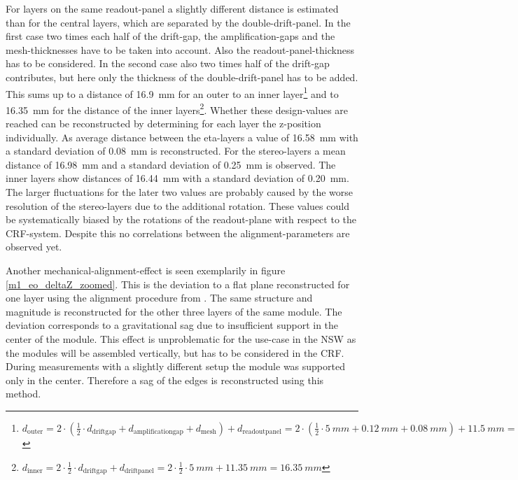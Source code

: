 \documentclass[
twoside,            %
BCOR1.4cm,          %
10pt,               %
headings=normal,    %
headsepline,        %
clearplainpage,		%
final,              %
div=14,
open=right,
bibliography=toc
]{scrreprt}
\begin{document}
For layers on the same readout-panel a slightly different distance is estimated than for the central layers, which are separated by the double-drift-panel.
In the first case two times each half of the drift-gap, the amplification-gaps and the mesh-thicknesses have to be taken into account.
Also the readout-panel-thickness has to be considered.
In the second case also two times half of the drift-gap contributes, but here only the thickness of the double-drift-panel has to be added.
This sums up to a distance of \SI{16.9}{mm} for an outer to an inner layer\footnote{
	$d_{\mathrm{outer}} = 
		2 \cdot 
			\left( 
					\tfrac{1}{2} \cdot d_{\mathrm{driftgap}} 
					+ d_{\mathrm{amplificationgap}} 
					+ d_{\mathrm{mesh}} 
			\right) 
		+ d_{\mathrm{readoutpanel}}
	   = 
		2 \cdot
			\left(
					\tfrac{1}{2} \cdot \SI{5}{mm}
					+ \SI{0.12}{mm}
					+ \SI{0.08}{mm}
			\right)
		+ \SI{11.5}{mm}
	= \SI{16.9}{mm}
	$
} 
 and to 
\SI{16.35}{mm} for the distance of the inner layers\footnote{
	$d_{\mathrm{inner}} = 
		2 \cdot \tfrac{1}{2} \cdot d_{\mathrm{driftgap}}
		+ d_{\mathrm{driftpanel}}
	   = 
		2 \cdot \tfrac{1}{2} \cdot \SI{5}{mm} 
		+ \SI{11.35}{mm}
	= \SI{16.35}{mm}
	$
}.
Whether these design-values are reached can be reconstructed by determining for each layer the z-position individually.
As average distance between the eta-layers a value of \SI{16.58}{mm} with a standard deviation of \SI{0.08}{mm} is reconstructed.
For the stereo-layers a mean distance of \SI{16.98}{mm} and a standard deviation of \SI{0.25}{mm} is observed.
The inner layers show distances of \SI{16.44}{mm} with a standard deviation of \SI{0.20}{mm}.
The larger fluctuations for the later two values are probably caused by the worse resolution of the stereo-layers due to the additional rotation.
These values could be systematically biased by the rotations of the readout-plane with respect to the CRF-system.
Despite this no correlations between the alignment-parameters are observed yet.

Another mechanical-alignment-effect is seen exemplarily in figure \ref{m1_eo_deltaZ_zoomed}.
This is the deviation to a flat plane reconstructed for one layer using the alignment procedure from \cite{loeselThesis}.
The same structure and magnitude is reconstructed for the other three layers of the same module.
The deviation corresponds to a gravitational sag due to insufficient support in the center of the module.
This effect is unproblematic for the use-case in the NSW as the modules will be assembled vertically, but has to be considered in the CRF.
During measurements with a slightly different setup the module was supported only in the center.
Therefore a sag of the edges is reconstructed using this method.
\end{document}

